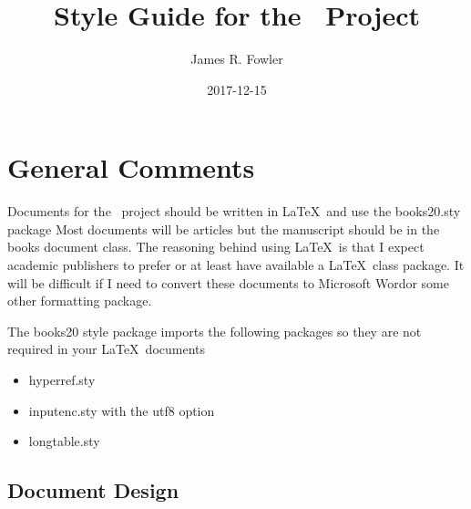 \documentclass{article}
\begin{document}
\title{Style Guide for the \PTitle\ Project}
\author{James R. Fowler}
\date{2017-12-15}

\maketitle

\section{General Comments}

Documents for the \PTitle\ project should be written in \LaTeX\ and use
the books20.sty package Most documents will be articles but the
manuscript should be in the books document class. The reasoning behind
using \LaTeX\ is that I expect academic publishers to prefer or at
least have available a \LaTeX\ class package.  It will be difficult if
I need to convert these documents to Microsoft Word\texttrademark or
some other formatting package.

The books20 style package imports the following packages so they are
not required in your \LaTeX\ documents

\begin{itemize}
\item hyperref.sty
\item inputenc.sty with the utf8 option
\item longtable.sty
\end{itemize}


\subsection{Document Design}
\end{document}
